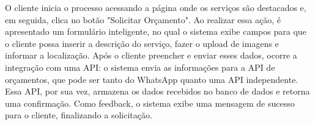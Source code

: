 O cliente inicia o processo acessando a página onde os serviços são destacados e, em seguida, clica no botão "Solicitar Orçamento". Ao realizar essa ação, é apresentado um formulário inteligente, no qual o sistema exibe campos para que o cliente possa inserir a descrição do serviço, fazer o upload de imagens e informar a localização. Após o cliente preencher e enviar esses dados, ocorre a integração com uma API: o sistema envia as informações para a API de orçamentos, que pode ser tanto do WhatsApp quanto uma API independente. Essa API, por sua vez, armazena os dados recebidos no banco de dados e retorna uma confirmação. Como feedback, o sistema exibe uma mensagem de sucesso para o cliente, finalizando a solicitação.










